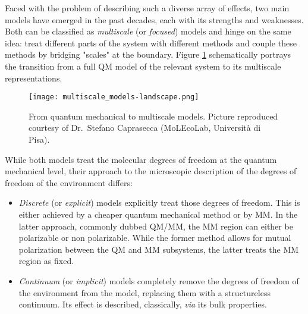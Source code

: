Faced with the problem of describing such a diverse array of effects,
two main models have emerged in the past decades, each with its
strengths and weaknesses.
Both can be classified as \emph{multiscale} (or \emph{focused})
models\autocite{Nobel2013} and hinge on the same idea: treat different
parts of the system with different methods and couple these methods by
bridging "scales" at the boundary.
Figure \ref{fig:qm-to-multiscale} schematically portrays the transition
from a full \acrshort{QM} model of the relevant system to its multiscale
representations.

\begin{figure}[tb]
\centering
\texttt{[image: multiscale\_models-landscape.png]}
\caption[From quantum mechanical to multiscale models]{
From quantum mechanical to multiscale models. Picture reproduced
courtesy of Dr.~Stefano Caprasecca (MoLEcoLab, Università di Pisa).}
\label{fig:qm-to-multiscale}
\end{figure}

While both models treat the molecular degrees of freedom at the quantum
mechanical level, their approach to the microscopic description of the
degrees of freedom of the environment differs:
\begin{itemize}
 \item
   \emph{Discrete} (or \emph{explicit}) models explicitly treat those
   degrees of freedom.
   This is either achieved by a cheaper quantum mechanical
   method\autocite{Vreven2006-gx} or by \gls{MM}.\autocite{Senn2009-sk}
   In the latter approach, commonly dubbed \acrshort{QM}/\acrshort{MM}, the \acrshort{MM}
   region can either be polarizable\autocite{Mennucci2013-go,
   Olsen2010-wa, Lipparini2011-rd} or non
   polarizable. While the former method allows for mutual polarization
   between the \acrshort*{QM} and \acrshort*{MM} subsystems, the latter
   treats the \acrshort*{MM} region as fixed.
 \item
   \emph{Continuum} (or \emph{implicit}) models completely remove the degrees
   of freedom of the environment from the model, replacing them with a
   structureless continuum.
   Its effect is described, classically, \emph{via} its bulk
   properties.\autocite{Onsager1936-wf, Miertus1981-mm}
\end{itemize}

